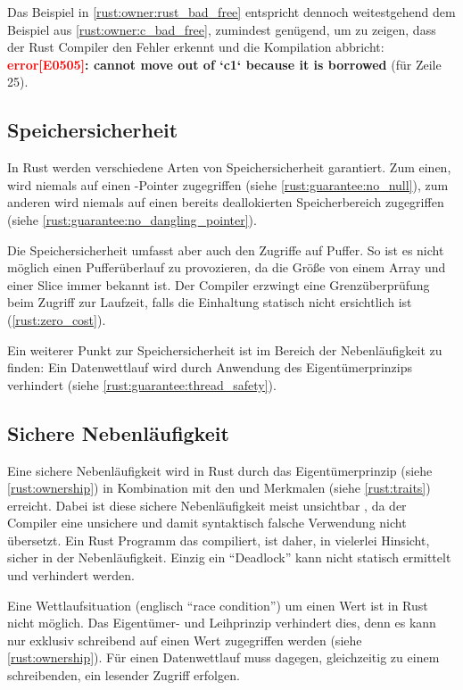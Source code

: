 Das Beispiel in \autoref{rust:owner:rust_bad_free} entspricht dennoch weitestgehend dem Beispiel aus \autoref{rust:owner:c_bad_free}, zumindest genügend, um zu zeigen, dass der Rust Compiler den Fehler erkennt und die Kompilation abbricht: \textbf{\textcolor{red}{error[E0505]}: cannot move out of `c1` because it is borrowed} (für Zeile 25).

\subsection{Speichersicherheit}
\label{rust:guarantee:memory_safety}


In Rust werden verschiedene Arten von Speichersicherheit garantiert. Zum einen, wird niemals auf einen -Pointer zugegriffen (siehe \autoref{rust:guarantee:no_null}), zum anderen wird niemals auf einen bereits deallokierten Speicherbereich zugegriffen (siehe \autoref{rust:guarantee:no_dangling_pointer}).

Die Speichersicherheit umfasst aber auch den Zugriffe auf Puffer. So ist es nicht möglich einen Pufferüberlauf zu provozieren, da die Größe von einem Array und einer Slice immer bekannt ist.
Der Compiler erzwingt eine Grenzüberprüfung beim Zugriff zur Laufzeit, falls die Einhaltung statisch nicht ersichtlich ist (\autoref{rust:zero_cost}).

Ein weiterer Punkt zur Speichersicherheit ist im Bereich der Nebenläufigkeit zu finden: Ein Datenwettlauf wird durch Anwendung des Eigentümerprinzips verhindert (siehe \autoref{rust:guarantee:thread_safety}).

\subsection{Sichere Nebenläufigkeit}
\label{rust:guarantee:thread_safety}

Eine sichere Nebenläufigkeit wird in Rust durch das Eigentümerprinzip (siehe \autoref{rust:ownership}) in Kombination mit den  und  Merkmalen (siehe \autoref{rust:traits}) erreicht.
Dabei ist diese sichere Nebenläufigkeit meist unsichtbar \cite[41]{rust:orly_programming}, da der Compiler eine unsichere und damit syntaktisch falsche Verwendung nicht übersetzt.
Ein Rust Programm das compiliert, ist daher, in vielerlei Hinsicht, sicher in der Nebenläufigkeit.
Einzig ein \enquote{Deadlock} kann nicht statisch ermittelt und verhindert werden.

Eine Wettlaufsituation (englisch \enquote{race condition}) um einen Wert ist in Rust nicht möglich.
Das Eigentümer- und Leihprinzip verhindert dies, denn es kann nur exklusiv schreibend auf einen Wert zugegriffen werden (siehe \autoref{rust:ownership}).
Für einen Datenwettlauf muss dagegen, gleichzeitig zu einem schreibenden, ein lesender Zugriff erfolgen.

